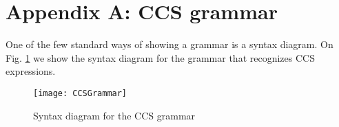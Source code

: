 \section*{Appendix A: CCS grammar}

One of the few standard ways of showing a grammar is a syntax diagram. On Fig. \ref{fig:CCSGrammar} we show the syntax diagram
for the grammar that recognizes CCS expressions.

\begin{figure}
\centering
\texttt{[image: CCSGrammar]}
\caption{Syntax diagram for the CCS grammar}
\label{fig:CCSGrammar}
\end{figure}